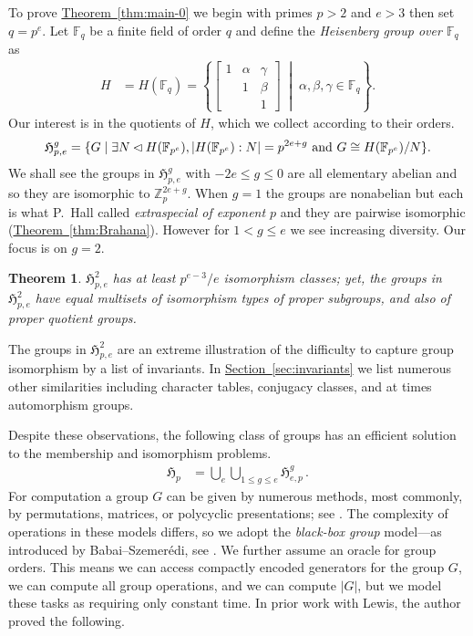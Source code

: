 \documentclass[11pt]{article}
\numberwithin{equation}{section}
\theoremstyle{definition}
\theoremstyle{plain}
\newcommand{\expref}[2]{\hyperref[#2]{#1~\ref{#2}}}
\numberwithin{equation}{section}
\theoremstyle{plain}       %
\newtheorem{thm}[equation]{Theorem}
\theoremstyle{remark}
\theoremstyle{definition}
\numberwithin{figure}{section}
\numberwithin{table}{section}
\newcommand{\mygroups}{\mathfrak{H}}
\newcommand{\bbF}{\mathbb{F}}  %
\begin{document}
To prove \expref{Theorem}{thm:main-0} we begin with primes $p>2$ and $e>3$ then set
$q=p^e$.  Let $\bbF_q$ be a finite field of order $q$ and define the
\emph{Heisenberg group over $\bbF_q$} as
\begin{align}
	H & = H(\bbF_q) = \left\{
		\begin{bmatrix} 
			1 & \alpha & \gamma \\
			  & 1 & \beta\\
			  & & 1
		\end{bmatrix}
		\;\middle|\;
		\alpha,\beta,\gamma\in \bbF_q\right\}.
\end{align}
Our interest is in the quotients of $H$, which we collect according to their
orders.
\begin{align}
	\mygroups_{p,e}^{g}  = \{G \mid \exists N\lhd H(\bbF_{p^e}), 
		|H(\bbF_{p^e}):N|=p^{2e+g}\textnormal{ and }G\cong H(\bbF_{p^e})/N\}.
\end{align}
We shall see the groups in $\mygroups_{p,e}^{g}$ with $-2e \leq g\leq 0$ are all
elementary abelian and so they are isomorphic to $\mathbb{Z}_p^{2e+g}$.  When
$g=1$ the groups are nonabelian but each is what P.\ Hall called
\emph{extraspecial of exponent $p$} and they are pairwise isomorphic
(\expref{Theorem}{thm:Brahana}). However for $1<g\leq e$ we see increasing
diversity.  Our focus is on $g=2$.



\begin{thm}\label{thm:main}
  $\mygroups_{p,e}^{2}$ has at least $p^{e-3}/e$ isomorphism classes;
  yet, the groups in $\mygroups_{p,e}^{2}$ have equal multisets of
  isomorphism types of proper subgroups, and also of proper quotient
  groups.
\end{thm}


The groups in $\mygroups_{p,e}^{2}$ are an extreme illustration of the
difficulty to capture group isomorphism by a list of invariants.  In
\expref{Section}{sec:invariants} we list numerous other similarities including
character tables, conjugacy classes, and at times automorphism groups.  
%
%
%

Despite these observations, the following class of groups has an efficient
solution to the membership and isomorphism problems.
\begin{align}
	\mygroups_p & = \bigcup_e\bigcup_{1\leq g\leq e} \mygroups_{e,p}^{g}\,.
\end{align}
For computation a group $G$ can be given by numerous methods, most commonly, by
permutations, matrices, or polycyclic presentations;
%
see \cite{Seress}.    %
The complexity of operations in these models differs, so we adopt the
\emph{black-box group} model---as introduced by Babai--Szemer\'edi, see
\cite[Chapter 2]{Seress}. We further assume an oracle for group orders.  This
means we can access compactly encoded generators for the group $G$, we can
compute all group operations, and we can compute $|G|$, but we model these tasks
as requiring only constant time.    In prior work with Lewis, the author proved
the following.
\end{document}
